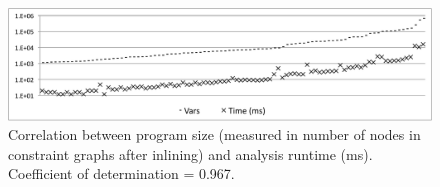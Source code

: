\documentclass{llncs}
\begin{document}
\begin{figure}[t!]
\begin{center}
\includegraphics[width=1\textwidth]{images/TimeCorr}
\end{center}
\caption{\label{fig:TimeCorr}
Correlation between program size (measured in number of nodes in constraint
graphs after inlining) and analysis runtime (ms).
Coefficient of determination = 0.967.
}
\end{figure}














\end{document}
